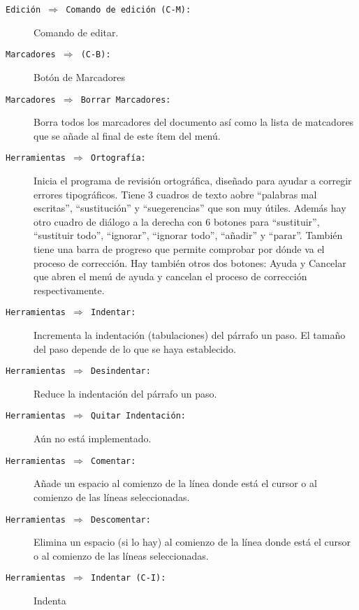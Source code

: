 \begin{description}
\item[{\tt Edición  $\Rightarrow$ Comando de edición  (C-M):}] Comando
de editar.

\item[{\tt Marcadores $\Rightarrow$ (C-B):}] Botón de Marcadores

\item[{\tt Marcadores  $\Rightarrow$ Borrar Marcadores:}]  Borra todos
los marcadores  del documento así como  la lista de matcadores  que se
añade al final de este ítem del menú.

\item[{\tt Herramientas $\Rightarrow$ Ortografía:}] Inicia el programa
de  revisión  ortográfica, diseñado  para  ayudar  a corregir  errores
tipográficos.  Tiene   3  cuadros   de  texto  aobre   ``palabras  mal
escritas'',  ``sustitución'' y  ``suegerencias'' que  son muy  útiles.
Además hay  otro cuadro  de diálogo  a la derecha  con 6  botones para
``sustituir'',  ``sustituir  todo'',  ``ignorar'',  ``ignorar  todo'',
``añadir''  y  ``parar''. También  tiene  una  barra de  progreso  que
permite comprobar por  dónde va el proceso de  corrección. Hay también
otros  dos botones:  Ayuda y  Cancelar que  abren el  menú de  ayuda y
cancelan el proceso de corrección respectivamente.

\item[{\tt  Herramientas   $\Rightarrow$  Indentar:}]   Incrementa  la
indentación (tabulaciones)  del párrafo  un paso.  El tamaño  del paso
depende de lo que se haya establecido.

\item[{\tt   Herramientas  $\Rightarrow$   Desindentar:}]  Reduce   la
indentación del párrafo un paso.

\item[{\tt  Herramientas $\Rightarrow$  Quitar  Indentación:}] Aún  no
está implementado.

\item[{\tt Herramientas $\Rightarrow$ Comentar:}]  Añade un espacio al
comienzo de la línea donde está el  cursor o al comienzo de las líneas
seleccionadas.

\item[{\tt  Herramientas   $\Rightarrow$  Descomentar:}]   Elimina  un
espacio (si lo hay) al comienzo de  la línea donde está el cursor o al
comienzo de las líneas seleccionadas.

\item[{\tt Herramientas $\Rightarrow$ Indentar (C-I):}] Indenta


\end{description}
